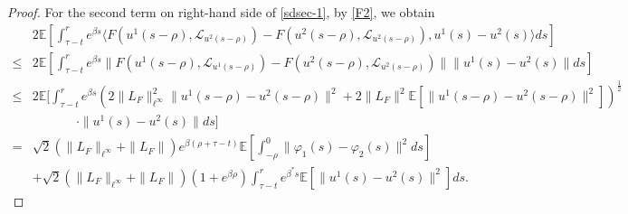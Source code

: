 \documentclass[11pt]{article}
\numberwithin{equation}{section}
\theoremstyle{plain}
\begin{document}
\begin{proof}
For the second term on right-hand side of \eqref{sdsec-1},
by \eqref{F2}, we obtain
\begin{align}\label{sdsec-3}
	& 2 \mathbb{E}
	            \left[ \int_{\tau-t}^{r} e^{\beta s}
	                         \langle F( u^1(s-\rho), \mathcal{L}_{u^2(s-\rho)}) 
	                                    - F(u^2(s-\rho), \mathcal{L}_{u^2(s-\rho)}),
	                                    u^1(s) - u^2(s)
	                         \rangle ds
	            \right]  \nonumber\\
	\le & 2 \mathbb{E}
	                  \left[ \int_{\tau-t}^{r} e^{\beta s}
	                               \|F( u^1(s-\rho), \mathcal{L}_{u^1(s-\rho)}) 
	                                  - F( u^2(s-\rho), \mathcal{L}_{u^2(s-\rho)}) \|
	                                  \|u^1(s) - u^2(s)\| ds
	                  \right]  \nonumber\\ 
	 \le & 
	          2  \mathbb{E}
	                \bigg[ \int_{\tau-t}^{r}  e^{\beta s}
	                        \left( 2 \|L_{F}\|_{\ell^\infty}^2  \| u^1(s-\rho) - u^2(s-\rho) \|^2 
	                        + 2 \|L_{F}\|^2\mathbb{E} \left[ \| u^1(s-\rho) - u^2(s-\rho) \|^2 \right]
	                        \right) ^{\frac{1}{2}}
	                       \nonumber \\
	              & \qquad\quad\ \
	               \cdot      \| u^1(s) - u^2(s) \|
	                        ds
	                \bigg]  \nonumber\\                          
	    = & \sqrt{2}( \|L_{F}\|_{\ell^\infty} +\|L_{F}\|)  e^{\beta (\rho+\tau-t)}
                    \mathbb{E}
                         \left[ \int_{-\rho}^{0}
                                      \| \varphi_1(s) - \varphi_2(s) \|^2 ds
                         \right]  \nonumber\\
           & + \sqrt{2}(\|L_{F}\|_{\ell^\infty}+\|L_{F}\|) (1+e^{\beta \rho})
                     \int_{\tau-t}^{r} e^{\beta^{*} s}
                          \mathbb{E}
                               \left[ \| u^1(s) - u^2(s) \|^2 
                               \right] 
                     ds. 
\end{align} 


\end{proof}
\end{document}
